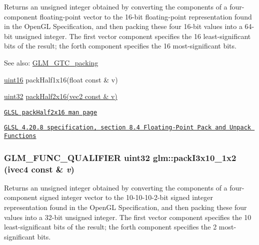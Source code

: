 Returns an unsigned integer obtained by converting the components of a four-component floating-point vector to the 16-bit floating-point representation found in the OpenGL Specification, and then packing these four 16-bit values into a 64-bit unsigned integer. The first vector component specifies the 16 least-significant bits of the result; the forth component specifies the 16 most-significant bits.

\begin{Desc}
\item[See also:]\hyperlink{group__gtc__packing}{GLM\_\-GTC\_\-packing} 

\hyperlink{group__gtc__type__precision_gd8c2939e1fdd8e5828b31d95c52255d5}{uint16} packHalf1x16(float const \& v) 

\hyperlink{group__gtc__type__precision_g202b6a53c105fcb7e531f9b443518451}{uint32} \hyperlink{group__core__func__packing_g082f6dd65f73a547ed3067ef00be036f}{packHalf2x16(vec2 const \& v)} 

\href{http://www.opengl.org/sdk/docs/manglsl/xhtml/packHalf2x16.xml}{\tt GLSL packHalf2x16 man page} 

\href{http://www.opengl.org/registry/doc/GLSLangSpec.4.20.8.pdf}{\tt GLSL 4.20.8 specification, section 8.4 Floating-Point Pack and Unpack Functions} \end{Desc}
\hypertarget{group__gtc__packing_g032e18fa5bc5b8f3897104aeb2f1e195}{
\subsubsection[packI3x10\_\-1x2]{\setlength{\rightskip}{0pt plus 5cm}GLM\_\-FUNC\_\-QUALIFIER uint32 glm::packI3x10\_\-1x2 (ivec4 const \& {\em v})}}
\label{group__gtc__packing_g032e18fa5bc5b8f3897104aeb2f1e195}


Returns an unsigned integer obtained by converting the components of a four-component signed integer vector to the 10-10-10-2-bit signed integer representation found in the OpenGL Specification, and then packing these four values into a 32-bit unsigned integer. The first vector component specifies the 10 least-significant bits of the result; the forth component specifies the 2 most-significant bits.

